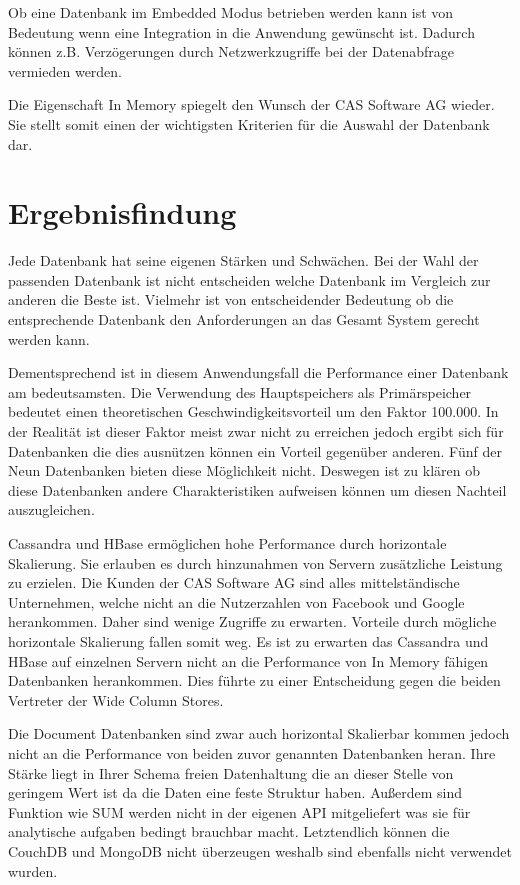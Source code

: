 Ob eine Datenbank im Embedded Modus betrieben werden kann ist von Bedeutung wenn eine Integration in die Anwendung gewünscht ist. Dadurch können z.B. Verzögerungen durch Netzwerkzugriffe bei der Datenabfrage vermieden werden. 

Die Eigenschaft In Memory spiegelt den Wunsch der CAS Software AG wieder. Sie stellt somit einen der wichtigsten Kriterien für die Auswahl der Datenbank dar.

\section{Ergebnisfindung}
\label{ch:AnalyseDatenbanken:sec:Ergebniss}

Jede Datenbank hat seine eigenen Stärken und Schwächen. Bei der Wahl der passenden Datenbank ist nicht entscheiden welche Datenbank im Vergleich zur anderen die Beste ist. Vielmehr ist von entscheidender Bedeutung ob die entsprechende Datenbank den Anforderungen an das Gesamt System gerecht werden kann. 

Dementsprechend ist in diesem Anwendungsfall die Performance einer Datenbank am bedeutsamsten. Die Verwendung des Hauptspeichers als Primärspeicher bedeutet einen theoretischen Geschwindigkeitsvorteil um den Faktor 100.000. In der Realität ist dieser Faktor meist zwar nicht zu erreichen jedoch ergibt sich für Datenbanken die dies ausnützen können ein Vorteil gegenüber anderen. Fünf der Neun Datenbanken bieten diese Möglichkeit nicht. Deswegen ist zu klären ob diese Datenbanken andere Charakteristiken aufweisen können um diesen Nachteil auszugleichen.

Cassandra und HBase ermöglichen hohe Performance durch horizontale Skalierung. Sie erlauben es durch hinzunahmen von Servern zusätzliche Leistung zu erzielen. Die Kunden der CAS Software AG sind alles mittelständische Unternehmen, welche nicht an die Nutzerzahlen von Facebook und Google herankommen. Daher sind wenige Zugriffe zu erwarten. Vorteile durch mögliche horizontale Skalierung fallen somit weg. Es ist zu erwarten das Cassandra und HBase auf einzelnen Servern nicht an die Performance von In Memory fähigen Datenbanken herankommen. Dies führte zu einer Entscheidung gegen die beiden Vertreter der Wide Column Stores.

Die Document Datenbanken sind zwar auch horizontal Skalierbar kommen jedoch nicht an die Performance von beiden zuvor genannten Datenbanken heran. Ihre Stärke liegt in Ihrer Schema freien Datenhaltung die an dieser Stelle von geringem Wert ist da die Daten eine feste Struktur haben. Außerdem sind Funktion wie SUM werden nicht in der eigenen API mitgeliefert was sie für analytische aufgaben bedingt brauchbar macht. Letztendlich können die CouchDB und MongoDB nicht überzeugen weshalb sind ebenfalls nicht verwendet wurden.

